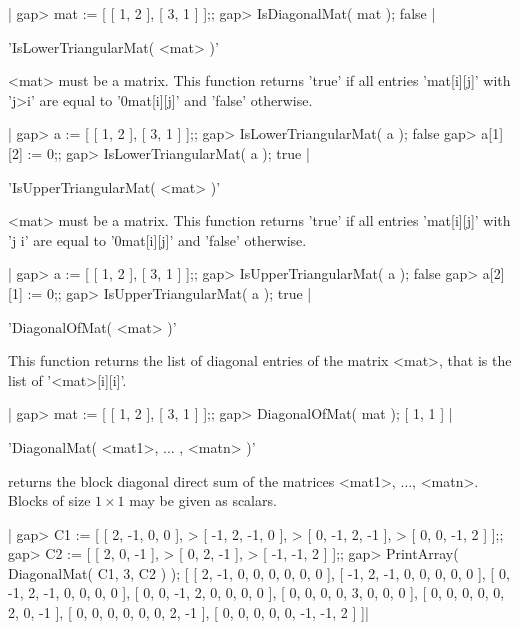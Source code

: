 |    gap> mat := [ [ 1, 2 ], [ 3, 1 ] ];;
    gap> IsDiagonalMat( mat );
    false |


'IsLowerTriangularMat( <mat> )'

<mat>  must be  a matrix.  This  function  returns 'true' if all  entries
 'mat[i][j]' with 'j>i'   are   equal  to '0\*mat[i][j]'   and    'false'
 otherwise.

|    gap> a := [ [ 1, 2 ], [ 3, 1 ] ];;
    gap> IsLowerTriangularMat( a );
    false
    gap> a[1][2] := 0;;
    gap> IsLowerTriangularMat( a );
    true |


'IsUpperTriangularMat( <mat> )'

<mat>  must  be  a  matrix.  This  function  returns  'true' if all entries
'mat[i][j]'  with  'j  \<  i'  are  equal  to  '0\*mat[i][j]'  and  'false'
otherwise.

|    gap> a := [ [ 1, 2 ], [ 3, 1 ] ];;
    gap> IsUpperTriangularMat( a );
    false
    gap> a[2][1] := 0;;
    gap> IsUpperTriangularMat( a );
    true |


'DiagonalOfMat( <mat> )'

This function returns the list of diagonal entries of the matrix <mat>,
that is the list of '<mat>[i][i]'.

|    gap> mat := [ [ 1, 2 ], [ 3, 1 ] ];;
    gap> DiagonalOfMat( mat );
    [ 1, 1 ] |

%

'DiagonalMat( <mat1>, ... , <matn> )'

returns the block diagonal direct sum of the matrices <mat1>, $\ldots$,
<matn>. Blocks of size $1\times 1$ may be given as scalars.

|    gap> C1 := [ [   2,  -1,   0,   0 ],
    >            [  -1,   2,  -1,   0 ],
    >            [   0,  -1,   2,  -1 ],
    >            [   0,   0,  -1,   2 ] ];;
    gap> C2 := [ [   2,   0,  -1 ],
    >            [   0,   2,  -1 ],
    >            [  -1,  -1,   2 ] ];;
    gap> PrintArray( DiagonalMat( C1, 3, C2 ) );
    [ [   2,  -1,   0,   0,   0,   0,   0,   0 ],
      [  -1,   2,  -1,   0,   0,   0,   0,   0 ],
      [   0,  -1,   2,  -1,   0,   0,   0,   0 ],
      [   0,   0,  -1,   2,   0,   0,   0,   0 ],
      [   0,   0,   0,   0,   3,   0,   0,   0 ],
      [   0,   0,   0,   0,   0,   2,   0,  -1 ],
      [   0,   0,   0,   0,   0,   0,   2,  -1 ],
      [   0,   0,   0,   0,   0,  -1,  -1,   2 ] ]|

